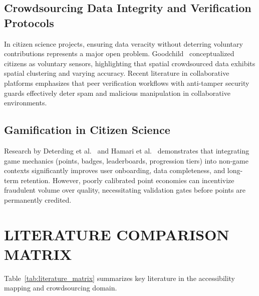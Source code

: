 \documentclass[12pt,a4paper]{report}
\begin{document}
\subsection{Crowdsourcing Data Integrity and Verification Protocols}
In citizen science projects, ensuring data veracity without deterring voluntary contributions represents a major open problem. Goodchild~\cite{goodchild2007} conceptualized citizens as voluntary sensors, highlighting that spatial crowdsourced data exhibits spatial clustering and varying accuracy. Recent literature in collaborative platforms emphasizes that peer verification workflows with anti-tamper security guards effectively deter spam and malicious manipulation in collaborative environments.

\subsection{Gamification in Citizen Science}
Research by Deterding et al.~\cite{deterding2011} and Hamari et al.~\cite{hamari2014} demonstrates that integrating game mechanics (points, badges, leaderboards, progression tiers) into non-game contexts significantly improves user onboarding, data completeness, and long-term retention. However, poorly calibrated point economies can incentivize fraudulent volume over quality, necessitating validation gates before points are permanently credited.

\section{LITERATURE COMPARISON MATRIX}
Table~\ref{tab:literature_matrix} summarizes key literature in the accessibility mapping and crowdsourcing domain.
\end{document}
